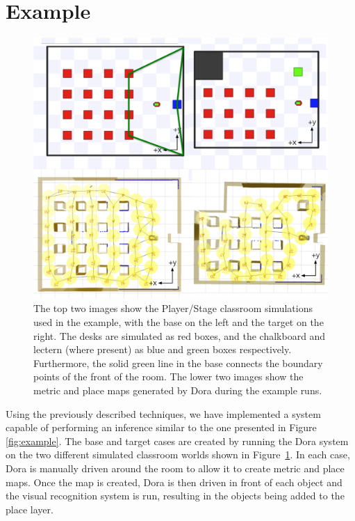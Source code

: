 \documentclass[letterpaper]{article}
\begin{document}
\section{Example}

\begin{figure}[t]
  \includegraphics[width=\columnwidth]{images/classroom-maps-axes-annotation.png}
  \caption{The top two images show the Player/Stage classroom simulations used in the example, with the base on the left and the target on the right. The desks are simulated as red boxes, and the chalkboard and lectern (where present) as blue and green boxes respectively. Furthermore, the solid green line in the base connects the boundary points of the front of the room. The lower two images show the metric and place maps generated by Dora during the example runs.}
  \label{fig:dora-maps}
\end{figure}

Using the previously described techniques, we have implemented a system capable of performing an inference similar to the one presented in Figure \ref{fig:example}. The base and target cases are created by running the Dora system on the two different simulated classroom worlds shown in Figure~\ref{fig:dora-maps}. In each case, Dora is manually driven around the room to allow it to create metric and place maps. Once the map is created, Dora is then driven in front of each object and the visual recognition system is run, resulting in the objects being added to the place layer. 
\end{document}
